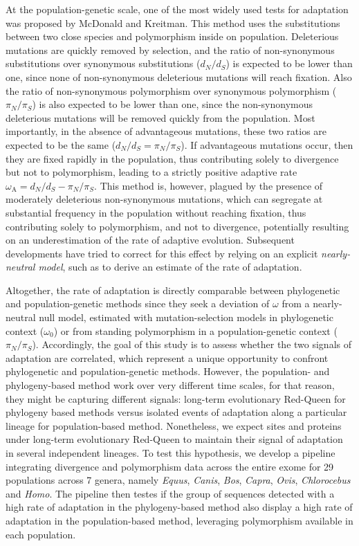 \documentclass{article}
\newcommand{\dn}{d_N}
\newcommand{\ds}{d_S}
\newcommand{\dnds}{\dn / \ds}
\newcommand{\pn}{\pi_N}
\newcommand{\ps}{\pi_S}
\newcommand{\pnps}{\pn / \ps}
\begin{document}
At the population-genetic scale, one of the most widely used tests for adaptation was proposed by McDonald and Kreitman\cite{mcdonald_adaptative_1991}.
This method uses the substitutions between two close species and polymorphism inside on population.
Deleterious mutations are quickly removed by selection, and the ratio of non-synonymous substitutions over synonymous substitutions ($\dnds$) is expected to be lower than one, since none of non-synonymous deleterious mutations will reach fixation.
Also the ratio of non-synonymous polymorphism over synonymous polymorphism ($\pnps$) is also expected to be lower than one, since the non-synonymous deleterious mutations will be removed quickly from the population.
Most importantly, in the absence of advantageous mutations, these two ratios are expected to be the same ($\dnds=\pnps$).
If advantageous mutations occur, then they are fixed rapidly in the population, thus contributing solely to divergence but not to polymorphism, leading to a strictly positive adaptive rate $\omega_{\mathrm{A}} = \dnds-\pnps$\cite{smith_adaptive_2002}.
This method is, however, plagued by the presence of moderately deleterious non-synonymous mutations, which can segregate at substantial frequency in the population without reaching fixation, thus contributing solely to polymorphism, and not to divergence, potentially resulting on an underestimation of the rate of adaptive evolution\cite{eyre-walker_quantifying_2002}.
Subsequent developments have tried to correct for this effect by relying on an explicit \textit{nearly-neutral model}, such as to derive an estimate of the rate of adaptation\cite{eyre-walker_estimating_2009, galtier_adaptive_2016}.

Altogether, the rate of adaptation is directly comparable between phylogenetic and population-genetic methods since they seek a deviation of $\omega$ from a nearly-neutral null model, estimated with mutation-selection models in phylogenetic context ($\omega_{0}$) or from standing polymorphism in a population-genetic context ($\pnps$).
Accordingly, the goal of this study is to assess whether the two signals of adaptation are correlated, which represent a unique opportunity to confront phylogenetic and population-genetic methods.
However, the population- and phylogeny-based method work over very different time scales, for that reason, they might be capturing different signals: long-term evolutionary Red-Queen for phylogeny based methods versus isolated events of adaptation along a particular lineage for population-based method.
Nonetheless, we expect sites and proteins under long-term evolutionary Red-Queen to maintain their signal of adaptation in several independent lineages.
To test this hypothesis, we develop a pipeline integrating divergence and polymorphism data across the entire exome for 29 populations across 7 genera, namely \textit{Equus}, \textit{Canis}, \textit{Bos}, \textit{Capra}, \textit{Ovis}, \textit{Chlorocebus} and \textit{Homo}.
The pipeline then testes if the group of sequences detected with a high rate of adaptation in the phylogeny-based method also display a high rate of adaptation in the population-based method, leveraging polymorphism available in each population.
\end{document}
